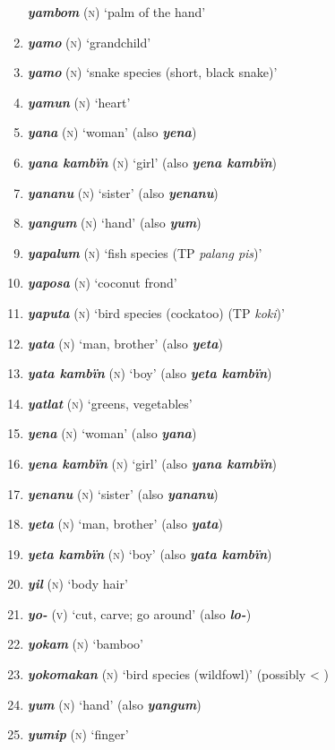 \begin{enumerate}[noitemsep, label={}, align=left, widest=190, labelsep=1ex,leftmargin=*,itemindent=-10pt]
\textbf{\textit{yambom}} (\textsc{n}) ‘palm of the hand’ \item
\textbf{\textit{yamo}} (\textsc{n}) ‘grandchild’ \item
\textbf{\textit{yamo}} (\textsc{n}) ‘snake species (short, black snake)’ \item
\textbf{\textit{yamun}} (\textsc{n}) ‘heart’ \item
\textbf{\textit{yana}} (\textsc{n}) ‘woman’ (also \textbf{\textit{yena}}) \item
\textbf{\textit{yana kambïn}} (\textsc{n}) ‘girl’ (also \textbf{\textit{yena kambïn}}) \item
\textbf{\textit{yananu}} (\textsc{n}) ‘sister’ (also \textbf{\textit{yenanu}}) \item
\textbf{\textit{yangum}} (\textsc{n}) ‘hand’ (also \textbf{\textit{yum}}) \item
\textbf{\textit{yapalum}} (\textsc{n}) ‘fish species (TP \textit{palang pis})’ \item
\textbf{\textit{yaposa}} (\textsc{n}) ‘coconut frond’ \item
\textbf{\textit{yaputa}} (\textsc{n}) ‘bird species (cockatoo) (TP \textit{koki})’ \item
\textbf{\textit{yata}} (\textsc{n}) ‘man, brother’ (also \textbf{\textit{yeta}}) \item
\textbf{\textit{yata kambïn}} (\textsc{n}) ‘boy’ (also \textbf{\textit{yeta kambïn}}) \item
\textbf{\textit{yatlat}} (\textsc{n}) ‘greens, vegetables’ \item
\textbf{\textit{yena}} (\textsc{n}) ‘woman’ (also \textbf{\textit{yana}}) \item
\textbf{\textit{yena kambïn}} (\textsc{n}) ‘girl’ (also \textbf{\textit{yana kambïn}}) \item
\textbf{\textit{yenanu}} (\textsc{n}) ‘sister’ (also \textbf{\textit{yananu}}) \item
\textbf{\textit{yeta}} (\textsc{n}) ‘man, brother’ (also \textbf{\textit{yata}}) \item
\textbf{\textit{yeta kambïn}} (\textsc{n}) ‘boy’ (also \textbf{\textit{yata kambïn}}) \item
\textbf{\textit{yil}} (\textsc{n}) ‘body hair’ \item
\textbf{\textit{yo-}} (\textsc{v}) ‘cut, carve; go around’ (also \textbf{\textit{lo-}}) \item
\textbf{\textit{yokam}} (\textsc{n}) ‘bamboo’ \item
\textbf{\textit{yokomakan}} (\textsc{n}) ‘bird species (wildfowl)’ (possibly < ) \item
\textbf{\textit{yum}} (\textsc{n}) ‘hand’ (also \textbf{\textit{yangum}}) \item
\textbf{\textit{yumip}} (\textsc{n}) ‘finger’
\end{enumerate}
